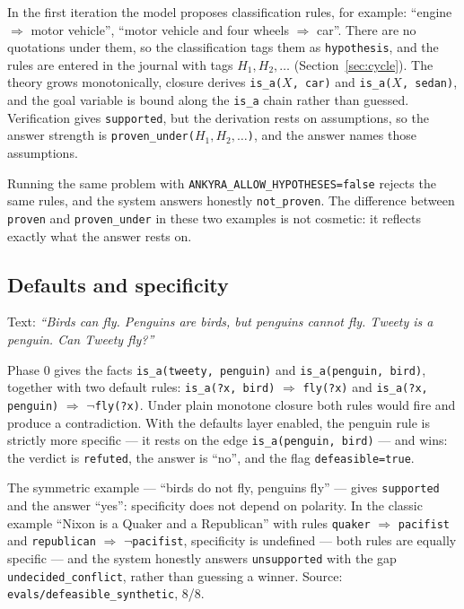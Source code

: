 \documentclass[11pt,a4paper]{article}
\begin{document}
In the first iteration the model proposes classification rules, for example: ``engine
$\Rightarrow$ motor vehicle'', ``motor vehicle and four wheels $\Rightarrow$ car''. There
are no quotations under them, so the classification tags them as \texttt{hypothesis}, and
the rules are entered in the journal with tags $H_1, H_2, \dots$ (Section~\ref{sec:cycle}).
The theory grows monotonically, closure derives \texttt{is\_a($X$, car)} and
\texttt{is\_a($X$, sedan)}, and the goal variable is bound along the \texttt{is\_a} chain
rather than guessed. Verification gives \texttt{supported}, but the derivation rests on
assumptions, so the answer strength is \texttt{proven\_under($H_1,H_2,\dots$)}, and the
answer names those assumptions.

Running the same problem with \texttt{ANKYRA\_ALLOW\_HYPOTHESES=false} rejects the same
rules, and the system answers honestly \texttt{not\_proven}. The difference between
\texttt{proven} and \texttt{proven\_under} in these two examples is not cosmetic: it
reflects exactly what the answer rests on.

\subsection{Defaults and specificity}

Text: \emph{``Birds can fly. Penguins are birds, but penguins cannot fly. Tweety is a
penguin. Can Tweety fly?''}

Phase 0 gives the facts \texttt{is\_a(tweety, penguin)} and \texttt{is\_a(penguin, bird)},
together with two default rules: \texttt{is\_a(?x, bird)} $\Rightarrow$ \texttt{fly(?x)} and
\texttt{is\_a(?x, penguin)} $\Rightarrow$ \texttt{$\neg$fly(?x)}. Under plain monotone
closure both rules would fire and produce a contradiction. With the defaults layer enabled,
the penguin rule is strictly more specific --- it rests on the edge \texttt{is\_a(penguin,
bird)} --- and wins: the verdict is \texttt{refuted}, the answer is ``no'', and the flag
\texttt{defeasible=true}.

The symmetric example --- ``birds do not fly, penguins fly'' --- gives \texttt{supported}
and the answer ``yes'': specificity does not depend on polarity. In the classic example
``Nixon is a Quaker and a Republican'' with rules \texttt{quaker} $\Rightarrow$
\texttt{pacifist} and \texttt{republican} $\Rightarrow$ \texttt{$\neg$pacifist}, specificity
is undefined --- both rules are equally specific --- and the system honestly answers
\texttt{unsupported} with the gap \texttt{undecided\_conflict}, rather than guessing a
winner. Source: \texttt{evals/defeasible\_synthetic}, 8/8.
\end{document}
